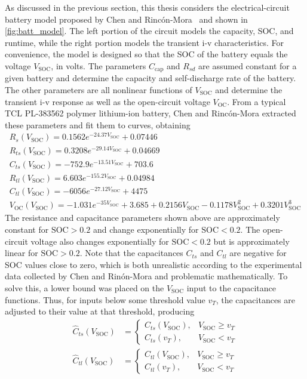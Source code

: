 \documentclass[../zhang_thesis.tex]{subfiles}
\begin{document}
As discussed in the previous section, this thesis considers the electrical-circuit battery model proposed by Chen and Rinc\'on-Mora~\cite{chen06} and shown in \cref{fig:batt_model}. The left portion of the circuit models the capacity, SOC, and runtime, while the right portion models the transient i-v characteristics.  For convenience, the model is designed so that the SOC of the battery equals the voltage $V_\text{SOC}$, in volts. The parameters $C_\text{cap}$ and
$R_{sd}$ are assumed constant for a given battery and determine the capacity and self-discharge rate of the battery. The other parameters are all nonlinear functions of $V_\text{SOC}$ and determine the transient i-v response as well as the open-circuit voltage $V_\text{OC}$. From a typical TCL PL-383562 polymer lithium-ion battery, Chen and Rinc\'on-Mora extracted these parameters and fit them to curves, obtaining
\begin{gather}
    R_s(V_\text{SOC}) = 0.1562 e^{-24.37 V_\text{SOC}} + 0.07446 \label{eq:nl_param_1} \\
    R_{ts}(V_\text{SOC}) = 0.3208 e^{-29.14 V_\text{SOC}} + 0.04669 \\
    C_{ts}(V_\text{SOC}) = -752.9 e^{-13.51 V_\text{SOC}} + 703.6 \\
    R_{tl}(V_\text{SOC}) = 6.603 e^{-155.2 V_\text{SOC}} + 0.04984 \\
    C_{tl}(V_\text{SOC}) = -6056 e^{-27.12 V_\text{SOC}} + 4475 \\
    V_\text{OC}(V_\text{SOC}) = -1.031 e^{-35 V_\text{SOC}} + 3.685 + 0.2156 V_\text{SOC} - 0.1178 V_\text{SOC}^2 + 0.3201 V_\text{SOC}^3 \label{eq:nl_param_6}
\end{gather}
The resistance and capacitance parameters shown above are approximately constant for $\text{SOC}>0.2$ and change exponentially for $\text{SOC}<0.2$. The open-circuit voltage also changes exponentially for $\text{SOC}<0.2$ but is approximately linear for $\text{SOC}>0.2$. Note that the capacitances $C_{ts}$ and $C_{tl}$ are negative for SOC values close to zero, which is both unrealistic according to the experimental data collected by Chen and Rin\'on-Mora and problematic
mathematically. To solve this, a lower bound was placed on the $V_\text{SOC}$ input to the capacitance functions. Thus, for inputs below some threshold value $v_T$, the capacitances are adjusted to their value at that threshold, producing
\begin{align}
    \hat{C}_{ts}(V_\text{SOC}) &= \begin{cases}
        C_{ts}(V_\text{SOC}), & V_\text{SOC} \ge v_T \\
        C_{ts}(v_T), & V_\text{SOC} < v_T
        \end{cases} \label{eq:Cts_thres} \\
    \hat{C}_{tl}(V_\text{SOC}) &= \begin{cases}
        C_{tl}(V_\text{SOC}), & V_\text{SOC} \ge v_T \\
        C_{tl}(v_T), & V_\text{SOC} < v_T \label{eq:Ctl_thres}
        \end{cases}
\end{align}
\end{document}
